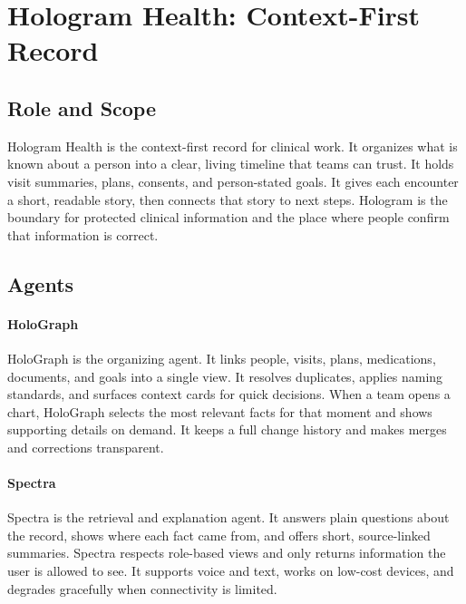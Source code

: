 \documentclass[12pt]{article}
\begin{document}
\section{Hologram Health: Context-First Record}

\subsection*{Role and Scope}
Hologram Health is the context-first record for clinical work. It organizes what is known about a person into a clear, living timeline that teams can trust. It holds visit summaries, plans, consents, and person-stated goals. It gives each encounter a short, readable story, then connects that story to next steps. Hologram is the boundary for protected clinical information and the place where people confirm that information is correct.

\subsection*{Agents}
\paragraph{HoloGraph}
HoloGraph is the organizing agent. It links people, visits, plans, medications, documents, and goals into a single view. It resolves duplicates, applies naming standards, and surfaces context cards for quick decisions. When a team opens a chart, HoloGraph selects the most relevant facts for that moment and shows supporting details on demand. It keeps a full change history and makes merges and corrections transparent.

\paragraph{Spectra}
Spectra is the retrieval and explanation agent. It answers plain questions about the record, shows where each fact came from, and offers short, source-linked summaries. Spectra respects role-based views and only returns information the user is allowed to see. It supports voice and text, works on low-cost devices, and degrades gracefully when connectivity is limited.
\end{document}

